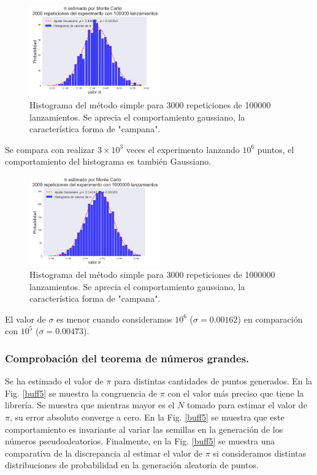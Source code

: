 \documentclass{rbf}
\begin{document}
\begin{figure}[tbp!]
 \centering
  \includegraphics[width=0.5\textwidth]{figures/3000rep1e5.png}
	\caption{Histograma del método simple para 3000 repeticiones de 100000 lanzamientos. Se aprecia el comportamiento gaussiano, la característica forma de "campana".}
 \label{buff2}
\end{figure}
Se compara con realizar $3 \times 10^3$ veces el experimento lanzando $10^6$ puntos, el comportamiento del histograma es también Gaussiano.
\begin{figure}[tbp!]
 \centering
  \includegraphics[width=0.5\textwidth]{figures/3000rep1e6.png}
	\caption{Histograma del método simple para 3000 repeticiones de 1000000 lanzamientos. Se aprecia el comportamiento gaussiano, la característica forma de "campana".}
 \label{buff3}
\end{figure}

El valor de $\sigma$ es menor cuando consideramos $10^6$ ($\sigma=0.00162$) en comparación con $10^5$ ($\sigma=0.00473$). 
\subsubsection{Comprobación del teorema de números grandes.}
Se ha estimado el valor de $\pi$ para distintas cantidades de puntos generados. En la Fig. \ref{buff5} se muestra la congruencia de $\pi$ con el valor más preciso que tiene la librería. Se muestra que mientras mayor es el $N$ tomado para estimar el valor de $\pi$, su error absoluto converge a cero.
En la Fig. \ref{buff5} se muestra que este comportamiento es invariante al variar las semillas en la generación de los números pseudoaleatorios. Finalmente, en la Fig. \ref{buff5} se muestra una comparativa de la discrepancia al estimar el valor de $\pi$ si consideramos distintas distribuciones de probabilidad en la generación aleatoria de puntos.
\end{document}
